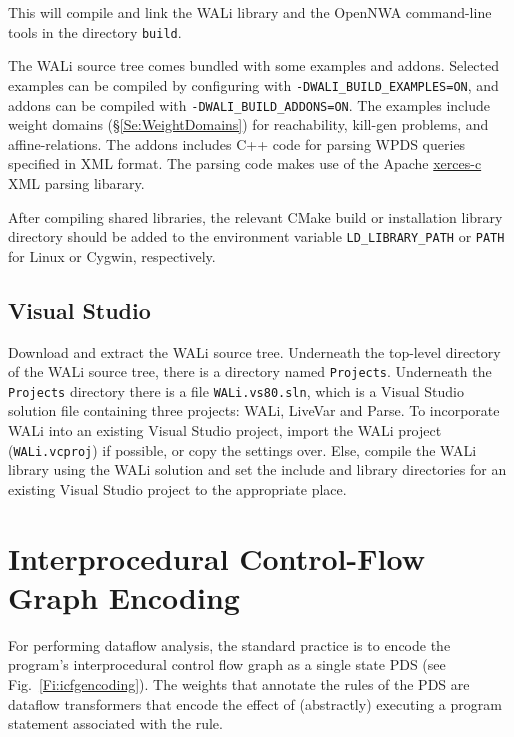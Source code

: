 \documentclass[english,a4paper,11pt]{article}
\theoremstyle{definition}
\def\WALi{\textsf{WALi}\xspace}
\newcommand{\sectref}[1]{\S\ref{Se:#1}}
\newcommand{\figref}[1]{Fig.~\ref{Fi:#1}}
\begin{document}
\noindent This will compile and link the \WALi library and the OpenNWA
command-line tools in the directory \verb!build!.

The \WALi source tree comes bundled with some examples and addons. Selected
examples can be compiled by configuring with
\verb!-DWALI_BUILD_EXAMPLES=ON!, and addons can be compiled with
\verb!-DWALI_BUILD_ADDONS=ON!. The examples include weight domains
(\sectref{WeightDomains})
for reachability, kill-gen problems, and affine-relations. The addons includes
C++ code for parsing WPDS queries specified in XML format. The parsing code
makes use of the Apache
\href{http://xerces.apache.org/xerces-c/}{xerces-c} XML parsing
libarary.

After compiling shared libraries, the relevant CMake build or installation
library directory should be added to the environment variable
\verb!LD_LIBRARY_PATH! or \verb!PATH! for Linux or Cygwin, respectively.

\subsection{Visual Studio}
\label{Se:VisualStudio}
Download and extract the \WALi source tree. Underneath the top-level directory of the \WALi
source tree, there is a directory named \verb!Projects!. Underneath the
\verb!Projects! directory there is a file \verb!WALi.vs80.sln!, which is a
Visual Studio solution file containing three projects: \WALi, LiveVar and
Parse. To incorporate \WALi into an existing Visual Studio project, import the
\WALi project (\verb!WALi.vcproj!) if possible, or copy the settings over.
Else, compile the \WALi library using the \WALi solution and set the include and
library directories for an existing Visual Studio project to the appropriate
place.

\section{Interprocedural Control-Flow Graph Encoding}
\label{Se:icfg-encoding}
For performing dataflow analysis, the standard practice is to encode the
program's interprocedural control flow graph as a single state PDS (see
\figref{icfgencoding}). The weights that annotate the rules of the PDS are
dataflow transformers that encode the effect of (abstractly) executing a
program statement associated with the rule.
\end{document}
